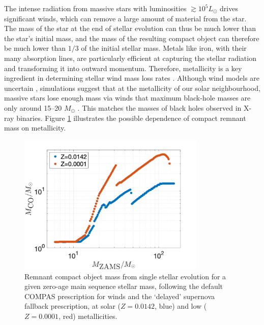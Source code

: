 \documentclass[review]{elsarticle}
\begin{document}
The intense radiation from massive stars with luminosities $\gtrsim 10^5 L_\odot$ drives significant winds, which can remove a large amount of material from the star. The mass of the star at the end of stellar evolution can thus be much lower than the star's initial mass, and the mass of the resulting compact object can therefore be much lower than $1/3$ of the initial stellar mass. Metals like iron, with their many absorption lines, are particularly efficient at capturing the stellar radiation and transforming it into outward momentum.  Therefore, metallicity is a key ingredient in determining stellar wind mass loss rates \citep{Vink:2001,Sander:2020}. Although wind models are uncertain \citep[e.g.,][]{Renzo:2017,Vink:2017}, simulations suggest that at the metallicity of our solar neighbourhood, massive stars lose enough mass via winds that maximum black-hole masses are only around 15--20 $M_\odot$ \citep{Belczynski:2009,Spera:2015}. This matches the masses of black holes observed in X-ray binaries. Figure \ref{fig:BHremnant} illustrates the possible dependence of compact remnant mass on metallicity. 
 
\begin{figure}
	\centering
	\includegraphics[width=0.8\textwidth]{BHremnantdelayed.png}
	\caption{\label{fig:BHremnant} Remnant compact object mass from single stellar evolution for a given zero-age main sequence stellar mass, following the default COMPAS prescription for winds \citep{COMPAS:2021}  and the `delayed' \citet{Fryer:2012} supernova fallback prescription, at solar  ($Z=0.0142$, blue) and low ($Z=0.0001$, red) metallicities.  
	} 
\end{figure}
\end{document}

